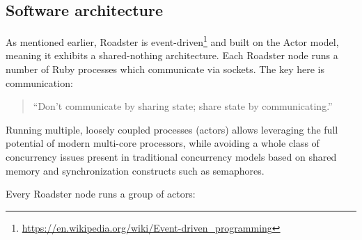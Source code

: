 \subsection{Software architecture}
As mentioned earlier, Roadster is event-driven\footnote{\url{https://en.wikipedia.org/wiki/Event-driven_programming}} and built on the Actor model, meaning it exhibits a
shared-nothing architecture. Each Roadster node runs a number of Ruby processes
which communicate via \zmq sockets. The key here is communication:

\begin{quote}
``Don't communicate by sharing state; share state by communicating.''
\end{quote}

Running multiple, loosely coupled processes (actors) allows leveraging the full
potential of modern multi-core processors, while avoiding a whole class of
concurrency issues present in traditional concurrency models based on shared
memory and synchronization constructs such as semaphores.

Every Roadster node runs a group of actors:

